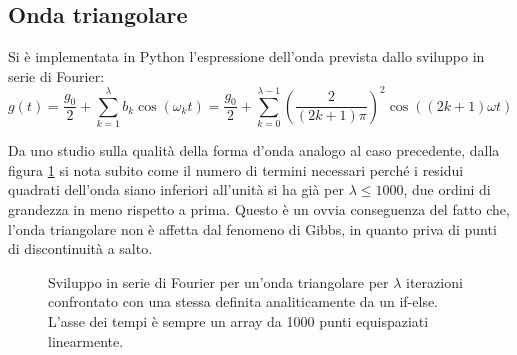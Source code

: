 \documentclass{article}[a4paper, oneside ,11pt]
\begin{document}
\subsection{Onda triangolare}
Si è implementata in Python l'espressione dell'onda prevista dallo sviluppo in serie di Fourier:
\begin{equation}
g(t)= \frac{g_0}{2} + \sum_{k=1}^{\lambda} b_k \cos{(\omega_kt)} = \frac{g_0}{2} + \sum_{k=0}^{\lambda-1} \left(\frac{2}{(2k+1)\pi}\right)^2 \cos{\left((2k+1)\omega t\right)}
\end{equation} 

Da uno studio sulla qualità della forma d'onda analogo al caso precedente, dalla figura \ref{plt:trg} si nota subito come il numero di termini necessari perché i residui quadrati dell'onda siano inferiori all'unità si ha già per $\lambda \leq 1000$, due ordini di grandezza in meno rispetto a prima. Questo è un ovvia conseguenza del fatto che, l'onda triangolare non è affetta dal fenomeno di Gibbs, in quanto priva di punti di discontinuità a salto.
\begin{figure}[!htb]
	\scalebox{0.55}{}\hfill \scalebox{0.55}{}
	\scalebox{0.55}{}\hfill \scalebox{0.55}{}
 	\caption{Sviluppo in serie di Fourier per un’onda triangolare per $\lambda$ iterazioni confrontato con una stessa definita analiticamente da un if-else. L'asse dei tempi è sempre un array da 1000 punti equispaziati linearmente. \label{plt:trg}}
\end{figure}
\end{document}
